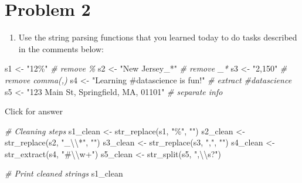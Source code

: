 \documentclass[
]{book}
\newenvironment{Shaded}{\begin{snugshade}}{\end{snugshade}}
\newcommand{\CommentTok}[1]{\textcolor[rgb]{0.56,0.35,0.01}{\textit{#1}}}
\newcommand{\FunctionTok}[1]{\textcolor[rgb]{0.00,0.00,0.00}{#1}}
\newcommand{\NormalTok}[1]{#1}
\newcommand{\OtherTok}[1]{\textcolor[rgb]{0.56,0.35,0.01}{#1}}
\newcommand{\SpecialCharTok}[1]{\textcolor[rgb]{0.00,0.00,0.00}{#1}}
\newcommand{\StringTok}[1]{\textcolor[rgb]{0.31,0.60,0.02}{#1}}
\providecommand{\tightlist}{%
  \setlength{\itemsep}{0pt}\setlength{\parskip}{0pt}}
\begin{document}
\hypertarget{problem-2}{%
\section{Problem 2}\label{problem-2}}

\begin{enumerate}
\def\labelenumi{\alph{enumi}.}
\tightlist
\item
  Use the string parsing functions that you learned today to do tasks described in the comments below:
\end{enumerate}

\begin{Shaded}
\begin{Highlighting}[]
\NormalTok{s1 }\OtherTok{\textless{}{-}} \StringTok{"12\%"}  \CommentTok{\# remove \%}
\NormalTok{s2 }\OtherTok{\textless{}{-}} \StringTok{"New Jersey\_*"}  \CommentTok{\# remove \_*}
\NormalTok{s3 }\OtherTok{\textless{}{-}} \StringTok{"2,150"}    \CommentTok{\# remove comma(,)}
\NormalTok{s4 }\OtherTok{\textless{}{-}} \StringTok{"Learning \#datascience is fun!"}   \CommentTok{\# extract \#datascience}
\NormalTok{s5 }\OtherTok{\textless{}{-}} \StringTok{"123 Main St, Springfield, MA, 01101"}   \CommentTok{\# separate info}
\end{Highlighting}
\end{Shaded}

Click for answer

\begin{Shaded}
\begin{Highlighting}[]
\CommentTok{\# Cleaning steps}
\NormalTok{s1\_clean }\OtherTok{\textless{}{-}} \FunctionTok{str\_replace}\NormalTok{(s1, }\StringTok{"\%"}\NormalTok{, }\StringTok{""}\NormalTok{)}
\NormalTok{s2\_clean }\OtherTok{\textless{}{-}} \FunctionTok{str\_replace}\NormalTok{(s2, }\StringTok{"\_}\SpecialCharTok{\textbackslash{}\textbackslash{}}\StringTok{*"}\NormalTok{, }\StringTok{""}\NormalTok{)}
\NormalTok{s3\_clean }\OtherTok{\textless{}{-}} \FunctionTok{str\_replace}\NormalTok{(s3, }\StringTok{","}\NormalTok{, }\StringTok{""}\NormalTok{)}
\NormalTok{s4\_clean }\OtherTok{\textless{}{-}} \FunctionTok{str\_extract}\NormalTok{(s4, }\StringTok{"\#}\SpecialCharTok{\textbackslash{}\textbackslash{}}\StringTok{w+"}\NormalTok{)}
\NormalTok{s5\_clean }\OtherTok{\textless{}{-}} \FunctionTok{str\_split}\NormalTok{(s5, }\StringTok{",}\SpecialCharTok{\textbackslash{}\textbackslash{}}\StringTok{s?"}\NormalTok{)}

\CommentTok{\# Print cleaned strings}
\NormalTok{s1\_clean}
\end{Highlighting}
\end{Shaded}
\end{document}
